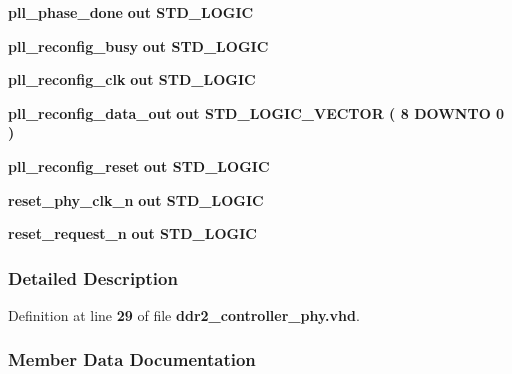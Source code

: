 \begin{DoxyCompactItemize}
{\bf pll\+\_\+phase\+\_\+done}  {\bfseries {\bfseries \textcolor{keywordflow}{out}\textcolor{vhdlchar}{ }}} {\bfseries \textcolor{comment}{S\+T\+D\+\_\+\+L\+O\+G\+IC}\textcolor{vhdlchar}{ }} 
\item 
{\bf pll\+\_\+reconfig\+\_\+busy}  {\bfseries {\bfseries \textcolor{keywordflow}{out}\textcolor{vhdlchar}{ }}} {\bfseries \textcolor{comment}{S\+T\+D\+\_\+\+L\+O\+G\+IC}\textcolor{vhdlchar}{ }} 
\item 
{\bf pll\+\_\+reconfig\+\_\+clk}  {\bfseries {\bfseries \textcolor{keywordflow}{out}\textcolor{vhdlchar}{ }}} {\bfseries \textcolor{comment}{S\+T\+D\+\_\+\+L\+O\+G\+IC}\textcolor{vhdlchar}{ }} 
\item 
{\bf pll\+\_\+reconfig\+\_\+data\+\_\+out}  {\bfseries {\bfseries \textcolor{keywordflow}{out}\textcolor{vhdlchar}{ }}} {\bfseries \textcolor{comment}{S\+T\+D\+\_\+\+L\+O\+G\+I\+C\+\_\+\+V\+E\+C\+T\+OR}\textcolor{vhdlchar}{ }\textcolor{vhdlchar}{(}\textcolor{vhdlchar}{ }\textcolor{vhdlchar}{ } \textcolor{vhdldigit}{8} \textcolor{vhdlchar}{ }\textcolor{keywordflow}{D\+O\+W\+N\+TO}\textcolor{vhdlchar}{ }\textcolor{vhdlchar}{ } \textcolor{vhdldigit}{0} \textcolor{vhdlchar}{ }\textcolor{vhdlchar}{)}\textcolor{vhdlchar}{ }} 
\item 
{\bf pll\+\_\+reconfig\+\_\+reset}  {\bfseries {\bfseries \textcolor{keywordflow}{out}\textcolor{vhdlchar}{ }}} {\bfseries \textcolor{comment}{S\+T\+D\+\_\+\+L\+O\+G\+IC}\textcolor{vhdlchar}{ }} 
\item 
{\bf reset\+\_\+phy\+\_\+clk\+\_\+n}  {\bfseries {\bfseries \textcolor{keywordflow}{out}\textcolor{vhdlchar}{ }}} {\bfseries \textcolor{comment}{S\+T\+D\+\_\+\+L\+O\+G\+IC}\textcolor{vhdlchar}{ }} 
\item 
{\bf reset\+\_\+request\+\_\+n}  {\bfseries {\bfseries \textcolor{keywordflow}{out}\textcolor{vhdlchar}{ }}} {\bfseries \textcolor{comment}{S\+T\+D\+\_\+\+L\+O\+G\+IC}\textcolor{vhdlchar}{ }} 
\end{DoxyCompactItemize}


\subsubsection{Detailed Description}


Definition at line {\bf 29} of file {\bf ddr2\+\_\+controller\+\_\+phy.\+vhd}.



\subsubsection{Member Data Documentation}
